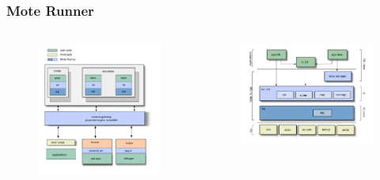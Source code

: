 \documentclass[12pt, compress]{beamer}
\begin{document}
\begin{frame}[fragile]
  \frametitle{Mote Runner}
  \begin{columns}
    \begin{column}{.5\linewidth}
    	\begin{figure}
	  \centering
	  \includegraphics[width=\textwidth]{img/overview.jpg}
    	\end{figure}
    \end{column}
    \hfill
    \begin{column}{.5\linewidth}
    	\begin{figure}
	  \centering
	  \includegraphics[width=\textwidth]{img/onmote.jpg}
    	\end{figure}
    \end{column}
  \end{columns}
\end{frame}
\end{document}
